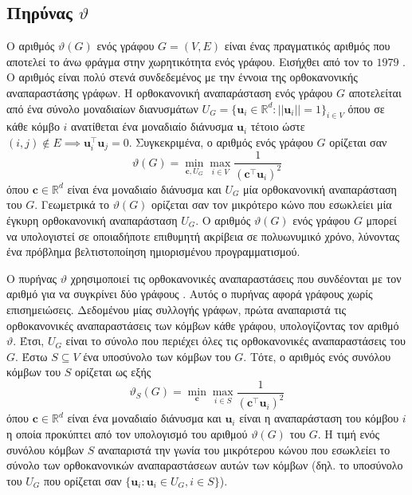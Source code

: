 \subsection{Πηρύνας  $\vartheta$}
\label{ssec:lovasz}
Ο αριθμός  $\vartheta(G)$ ενός γράφου $G=(V,E)$ είναι ένας πραγματικός αριθμός που αποτελεί το άνω φράγμα στην χωρητικότητα  ενός γράφου.
Εισήχθει από τον  το $1979$ \cite{lovasz1979shannon}.
Ο αριθμός  είναι πολύ στενά συνδεδεμένος με την έννοια της ορθοκανονικής αναπαραστάσης γράφων.
Η ορθοκανονική αναπαράσταση ενός γράφου $G$ αποτελείται από ένα σύνολο μοναδιαίων διανυσμάτων $U_G = \{ \mathbf{u}_i \in \mathbb{R}^d : || \mathbf{u}_i || = 1 \}_{i \in V}$ όπου σε κάθε κόμβο $i$ ανατίθεται ένα μοναδιαίο διάνυσμα $\mathbf{u}_i$ τέτοιο ώστε $(i,j) \not \in E \implies \mathbf{u}_i^\top \mathbf{u}_j = 0$.
Συγκεκριμένα, ο αριθμός  ενός γράφου $G$ ορίζεται σαν
\begin{equation}
    \vartheta(G) = \min_{\mathbf{c}, U_G} \max_{i \in V} \frac{1}{(\mathbf{c}^\top \mathbf{u}_i)^2}
\end{equation}
όπου $\mathbf{c} \in \mathbb{R}^d$ είναι ένα μοναδιαίο διάνυσμα και $U_G$ μία ορθοκανονική αναπαράσταση του $G$. 
Γεωμετρικά το $\vartheta(G)$ ορίζεται σαν τον μικρότερο κώνο που εσωκλείει μία έγκυρη ορθοκανονική αναπαράσταση $U_G$.
Ο αριθμός  $\vartheta(G)$ ενός γράφου $G$ μπορεί να υπολογιστεί σε οποιαδήποτε επιθυμητή ακρίβεια σε πολυωνυμικό χρόνο, λύνοντας ένα πρόβλημα βελτιστοποίηση ημιορισμένου προγραμματισμού.

Ο πυρήνας  $\vartheta$ χρησιμοποιεί τις ορθοκανονικές αναπαραστάσεις που συνδέονται με τον αριθμό  για να συγκρίνει δύο γράφους \cite{johansson2014global}.
Αυτός ο πυρήνας αφορά γράφους χωρίς επισημειώσεις.
Δεδομένου μίας συλλογής γράφων, πρώτα αναπαριστά τις ορθοκανονικές αναπαραστάσεις των κόμβων κάθε γράφου, υπολογίζοντας τον αριθμό  $\vartheta$.
Έτσι, $U_G$ είναι το σύνολο που περιέχει όλες τις ορθοκανονικές αναπαραστάσεις του $G$.
Έστω $S \subseteq V$ ένα υποσύνολο των κόμβων του $G$.
Τότε, ο αριθμός  ενός συνόλου κόμβων του $S$ ορίζεται ως εξής
\begin{equation}
    \vartheta_S(G) = \min_{\mathbf{c}} \max_{i \in S} \frac{1}{(\mathbf{c}^\top \mathbf{u}_i)^2}
\end{equation}
όπου $\mathbf{c} \in \mathbb{R}^d$ είναι ένα μοναδιαίο διάνυσμα και $\mathbf{u}_i$ είναι η αναπαράσταση του κόμβου $i$ η οποία προκύπτει από τον υπολογισμό του αριθμού  $\vartheta(G)$ του $G$.
Η τιμή  ενός συνόλου κόμβων $S$ αναπαριστά την γωνία του μικρότερου κώνου που εσωκλείει το σύνολο των ορθοκανονικών αναπαραστάσεων αυτών των κόμβων (δηλ. το υποσύνολο του $U_G$ που ορίζεται σαν $\{ \mathbf{u}_i : \mathbf{u}_i \in U_G, i \in S \}$).

